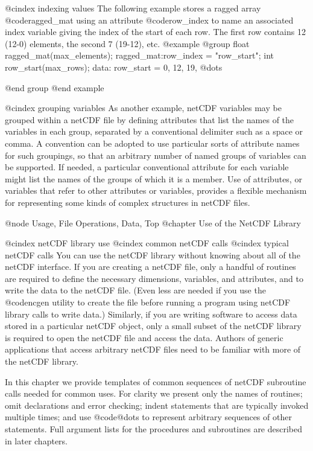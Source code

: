 @cindex indexing values
The following example stores a ragged array @code{ragged_mat} using
an attribute @code{row_index}
to name an associated index variable giving the index of the start of
each row.
The first row contains 12 (12-0) elements, the second 7 (19-12), etc.
@example
@group
        float   ragged_mat(max_elements);
                ragged_mat:row_index = "row_start";
        int     row_start(max_rows);
data:
        row_start   = 0, 12, 19, @dots{}

@end group
@end example

@cindex grouping variables
As another example, netCDF variables may be grouped within a netCDF file
by defining attributes that list the names of the variables in each
group, separated by a conventional delimiter such as a space or comma.
A convention can be adopted to use particular sorts of attribute names
for such groupings, so that an arbitrary number of named groups of
variables can be supported.  If needed, a particular conventional
attribute for each variable might list the names of the groups of which
it is a member.  Use of attributes, or variables that refer to other
attributes or variables, provides a flexible mechanism for representing
some kinds of complex structures in netCDF files.

@node Usage, File Operations, Data, Top
@chapter Use of the NetCDF Library

@cindex netCDF library use
@cindex common netCDF calls
@cindex typical netCDF calls
You can use the netCDF library without knowing about all of the netCDF
interface.  If you are creating a netCDF file, only a handful of
routines are required to define the necessary dimensions, variables, and
attributes, and to write the data to the netCDF file.
(Even less are needed if you use the @code{ncgen} utility to create the file
before running a program using netCDF library calls to write data.)
Similarly, if you
are writing software to access data stored in a particular netCDF
object, only a small subset of the netCDF library is required to open
the netCDF file and access the data.  Authors of generic
applications that access arbitrary netCDF files need to be familiar with
more of the netCDF library.

In this chapter we provide templates of common sequences of netCDF
subroutine calls needed for common uses.  For clarity we present only
the names of routines; omit declarations and error checking; indent
statements that are typically invoked multiple times; and use
@code{@dots{}} to represent arbitrary sequences of other statements.
Full argument lists for the procedures and subroutines are described in
later chapters.



